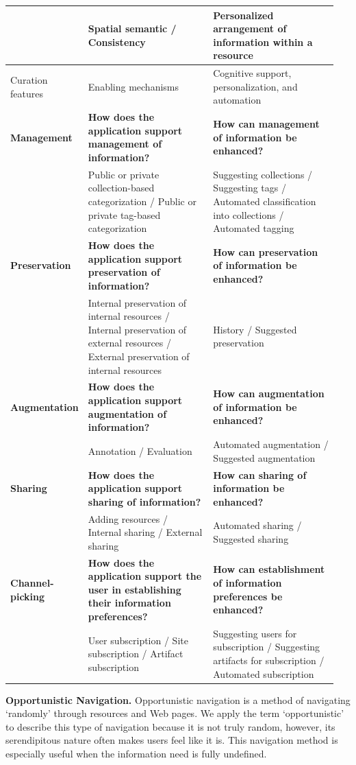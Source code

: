 \documentclass{sigchi}
\begin{document}
{\begin{table}[!htb]
\begin{tabular}{|p{0.15\linewidth}| p{0.40\linewidth}| p{0.40\linewidth}|}
& Spatial semantic / Consistency & Personalized arrangement of information within a resource  \\ 
\hline
Curation features &Enabling mechanisms & Cognitive support, personalization, and automation \\
\hline
\textbf{Management} & \textbf{How does the application support management of information?} & \textbf{How can management of information be enhanced?}\\
& Public or private collection-based categorization / Public or private tag-based categorization & Suggesting collections / Suggesting tags / Automated classification into collections / Automated tagging \\
\textbf{Preservation} & \textbf{How does the application support preservation of information?} & \textbf{How can preservation of information be enhanced?}\\
& Internal preservation of internal resources / Internal preservation of external resources / External preservation of internal resources & History / Suggested preservation  \\
\textbf{Augmentation} & \textbf{How does the application support augmentation of information?} & \textbf{How can augmentation of information be enhanced?}\\
& Annotation / Evaluation & Automated augmentation / Suggested augmentation \\ 
\textbf{Sharing} & \textbf{How does the application support sharing of information?} & \textbf{How can sharing of information be enhanced?}\\
& Adding resources / Internal sharing / External sharing & Automated sharing / Suggested sharing \\
\textbf{Channel-picking}  	& \textbf{How does the application support the user in establishing their information preferences?} & \textbf{How can establishment of information preferences be enhanced?}\\
& User subscription / Site subscription / Artifact subscription & Suggesting users for subscription / Suggesting artifacts for subscription / Automated subscription \\     
\hline
\end{tabular}
\end{table}

\textbf{Opportunistic Navigation.}
Opportunistic navigation is a method of navigating `randomly' through resources and Web pages. We apply the term `opportunistic' to describe this type of navigation because it is not truly random, however, its serendipitous nature often makes users feel like it is. This navigation method is especially useful when the information need is fully undefined.

}
\end{document}
